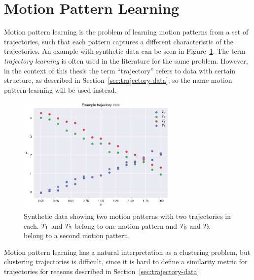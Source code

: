 \section{Motion Pattern Learning}
Motion pattern learning is the problem of learning motion patterns from a
set of trajectories, such that each pattern captures a different
characteristic of the trajectories. An example with synthetic data can be
seen in Figure~\ref{fig:motion-pattern-example}. The term
\textit{trajectory learning} is often used in the literature for the
same problem. However, in the
context of this thesis the term ``trajectory'' refers to data with
certain structure, as described in Section~\ref{sec:trajectory-data}, so 
the name motion pattern learning will be used instead.
\begin{figure}[H]
  \centering
  \includegraphics[width=0.7\textwidth]{figures/motion-pattern-example}
  \caption{Synthetic data showing two motion patterns with two trajectories in
    each. $T_1$ and $T_2$ belong to one motion pattern and
    $T_0$ and $T_3$ belong to a second motion pattern.}\label{fig:motion-pattern-example}
\end{figure}
Motion pattern learning has a natural interpretation as a
clustering problem, but clustering trajectories is difficult,
since it is hard to define a similarity metric for trajectories for
reasons described in Section~\ref{sec:trajectory-data}.

